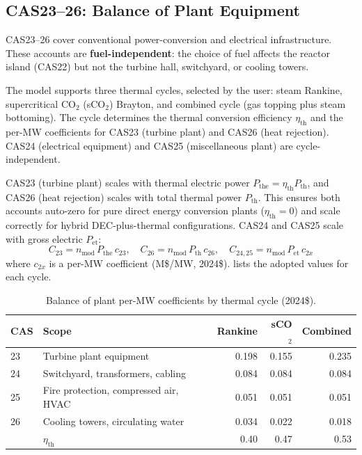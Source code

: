 \documentclass{article}
\begin{document}
\subsection{CAS23--26: Balance of Plant Equipment}
\label{sec:cas23-26}

CAS23--26 cover conventional power-conversion and electrical infrastructure.
These accounts are \textbf{fuel-independent}: the choice of fuel
affects the reactor island (CAS22) but not the turbine hall, switchyard,
or cooling towers.

The model supports three thermal cycles, selected by the user: steam
Rankine, supercritical CO$_2$ (sCO$_2$) Brayton, and combined cycle
(gas topping plus steam bottoming).  The cycle determines the thermal
conversion efficiency $\eta_{\text{th}}$ and the per-MW coefficients for
CAS23 (turbine plant) and CAS26 (heat rejection).  CAS24 (electrical
equipment) and CAS25 (miscellaneous plant) are cycle-independent.

CAS23 (turbine plant) scales with thermal electric power
$P_{\text{the}} = \eta_{\text{th}} P_{\text{th}}$, and CAS26 (heat
rejection) scales with total thermal power $P_{\text{th}}$.  This ensures
both accounts auto-zero for pure direct energy conversion plants
($\eta_{\text{th}} = 0$) and scale correctly for hybrid DEC-plus-thermal
configurations.  CAS24 and CAS25 scale with gross electric $P_{\text{et}}$:
\begin{equation}
\label{eq:bop}
C_{23} = n_{\text{mod}} \, P_{\text{the}} \, c_{23}, \quad
C_{26} = n_{\text{mod}} \, P_{\text{th}} \, c_{26}, \quad
C_{24,25} = n_{\text{mod}} \, P_{\text{et}} \, c_{2x}
\end{equation}
\noindent where $c_{2x}$ is a per-MW coefficient (M\$/MW, 2024\$).
 lists the adopted values for each cycle.

\begin{table}[htbp]
\caption{Balance of plant per-MW coefficients by thermal cycle (2024\$).}
\label{tab:bop}
\centering
\begin{tabular}{llrrr}
\toprule
CAS & Scope & Rankine & sCO$_2$ & Combined \\
\midrule
23 & Turbine plant equipment & 0.198 & 0.155 & 0.235 \\
24 & Switchyard, transformers, cabling & 0.084 & 0.084 & 0.084 \\
25 & Fire protection, compressed air, HVAC & 0.051 & 0.051 & 0.051 \\
26 & Cooling towers, circulating water & 0.034 & 0.022 & 0.018 \\
\midrule
& $\eta_{\text{th}}$ & 0.40 & 0.47 & 0.53 \\
\bottomrule
\end{tabular}
\end{table}
\end{document}
